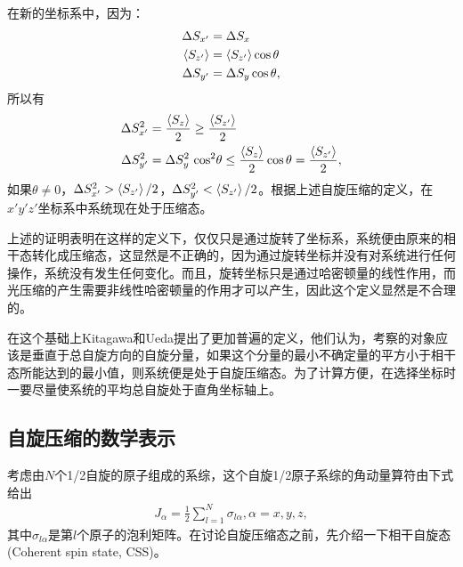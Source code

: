 在新的坐标系中，因为：
\begin{align}\label{eq3312}
	\begin{split}
		\Delta S_{x'} & = \Delta {S_x}\\
		\braket{S_{z'}} & = \braket{S_{z'}}  \cos \theta \\
		\Delta {S_{y'}} & = \Delta {S_y}\cos \theta ,
	\end{split}
\end{align}
所以有
\begin{align}\label{eq3313}
	\begin{split}
		\Delta S_{x'}^2 &= \frac{\braket{S_z}}{2} \ge \frac{\braket{S_{z'}}}{2}\\
		\Delta S_{y'}^2 &= \Delta S_y^2~{\cos ^2}\theta  \le \frac{\braket{S_z}}{2}\cos \theta  = \frac{\braket{S_{z'}}}{2},
	\end{split}
\end{align}
如果$\theta\ne 0$，$\Delta S_{x'}^2 > \braket{S_{z'}}/2$，$\Delta S_{y'}^2 < \braket{S_{z'}}/2$。根据上述自旋压缩的定义，在$x'y'z'$坐标系中系统现在处于压缩态。

上述的证明表明在这样的定义下，仅仅只是通过旋转了坐标系，系统便由原来的相干态转化成压缩态，这显然是不正确的，因为通过旋转坐标并没有对系统进行任何操作，系统没有发生任何变化。而且，旋转坐标只是通过哈密顿量的线性作用，而光压缩的产生需要非线性哈密顿量的作用才可以产生，因此这个定义显然是不合理的。

在这个基础上Kitagawa和Ueda提出了更加普遍的定义，他们认为，考察的对象应该是垂直于总自旋方向的自旋分量，如果这个分量的最小不确定量的平方小于相干态所能达到的最小值，则系统便是处于自旋压缩态。为了计算方便，在选择坐标时一要尽量使系统的平均总自旋处于直角坐标轴上。

\subsection{自旋压缩的数学表示}

考虑由$N$个1/2自旋的原子组成的系综，这个自旋1/2原子系综的角动量算符由下式给出
\begin{align}
	{J_\alpha } = \frac{1}{2}\sum\limits_{l = 1}^N {{\sigma _{l\alpha }}} ,\alpha  = x,y,z,\label{eq3314}
\end{align}
其中$\sigma_{l\alpha}$是第$l$个原子的泡利矩阵。在讨论自旋压缩态之前，先介绍一下相干自旋态(Coherent spin state, CSS)。

